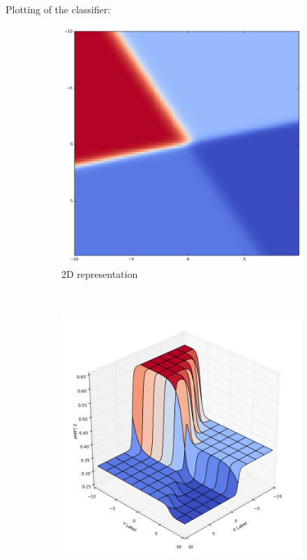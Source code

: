 \documentclass[paper=a4, fontsize=11pt]{scrartcl} %
\begin{document}
    \newpage
    Plotting of the classifier:
    \begin{figure}[h!]
        \centering
        \begin{subfigure}[b]{0.65\textwidth}
            \setlength{\fboxsep}{0.5pt} %
            \setlength{\fboxrule}{0.5pt}
            \includegraphics[width=\textwidth,fbox]{../images/NN_MinhNguyen_20161010_ex1-13.png}
            \caption{2D representation}
        \end{subfigure}
        ~
        \begin{subfigure}[b]{0.65\textwidth}
            \setlength{\fboxsep}{0.5pt} %
            \setlength{\fboxrule}{0.5pt}
            \includegraphics[width=\textwidth,fbox]{../images/NN_MinhNguyen_20161010_ex1-13_3d.png}

\end{subfigure}
\end{figure}
\end{document}
